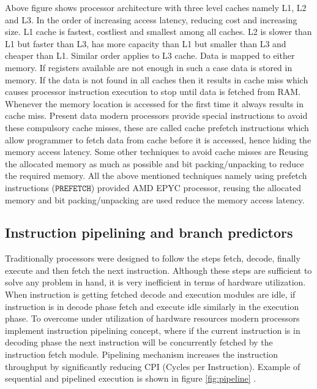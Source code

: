 Above figure shows processor architecture with three level caches namely L1, L2 and L3. In the order of increasing access latency, reducing cost and increasing size. L1 cache is fastest, costliest and smallest among all caches. L2 is slower than L1 but faster than L3, has more capacity than L1 but smaller than L3 and cheaper than L1. Similar order applies to L3 cache. Data is mapped to either memory. If registers available are not enough in such a case data is stored in memory. If the data is not found in all caches then it results in cache miss which causes processor instruction execution to stop until data is fetched from RAM. Whenever the memory location is accessed for the first time it always results in cache miss. Present data modern processors provide special instructions to avoid these compulsory cache misses, these are called cache prefetch instructions which allow programmer to fetch data from cache before it is accessed, hence hiding the memory access latency. Some other techniques to avoid cache misses are Reusing the allocated memory as much as possible and bit packing/unpacking to reduce the required memory. All the above mentioned techniques namely using prefetch instructions ($\mathtt{PREFETCH}$) provided AMD EPYC processor, reusing the allocated memory and bit packing/unpacking are used reduce the memory access latency.

\subsection{Instruction pipelining and branch predictors}
Traditionally processors were designed to follow the steps fetch, decode, finally execute and then fetch the next instruction. Although these steps are sufficient to solve any problem in hand, it is very inefficient in terms of hardware utilization. When instruction is getting fetched decode and execution modules are idle, if instruction is in decode phase fetch and execute idle similarly in the execution phase. To overcome under utilization of hardware resources modern processors implement instruction pipelining concept, where if the current instruction is in decoding phase the next instruction will be concurrently fetched by the instruction fetch module. Pipelining mechanism increases the instruction throughput by significantly reducing CPI (Cycles per Instruction). Example of sequential and pipelined execution is shown in figure \ref{fig:pipeline} \cite{SoCT}.

